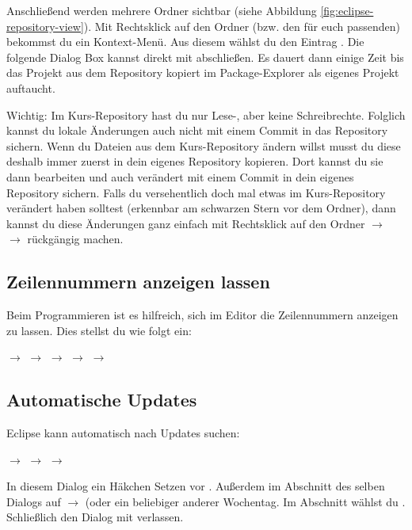 Anschließend werden mehrere Ordner sichtbar (siehe Abbildung
\ref{fig:eclipse-repository-view}). Mit Rechtsklick auf den Ordner 
(bzw. den für euch passenden) bekommst du ein Kontext-Menü. Aus diesem wählst du
den Eintrag . Die folgende Dialog Box kannst direkt mit
 abschließen. Es dauert dann einige Zeit bis das Projekt aus dem
Repository kopiert im Package-Explorer als eigenes Projekt auftaucht.

Wichtig: Im Kurs-Repository hast du nur Lese-, aber keine Schreibrechte.
Folglich kannst du lokale Änderungen auch nicht mit einem Commit in das
Repository sichern. Wenn du Dateien aus dem Kurs-Repository ändern willst musst
du diese deshalb immer zuerst in dein eigenes Repository kopieren. Dort kannst
du sie dann bearbeiten und auch verändert mit einem Commit in dein eigenes
Repository sichern. Falls du versehentlich doch mal etwas im Kurs-Repository
verändert haben solltest (erkennbar am schwarzen Stern vor dem Ordner), dann
kannst du diese Änderungen ganz einfach mit Rechtsklick auf den
Ordner $\rightarrow$  $\rightarrow$  rückgängig
machen.


\subsection{Zeilennummern anzeigen lassen}

Beim Programmieren ist es hilfreich, sich im Editor die Zeilennummern anzeigen
zu lassen. Dies stellst du wie folgt ein:

 $\rightarrow$  $\rightarrow$
 $\rightarrow$  $\rightarrow$  $\rightarrow$ 

\subsection{Automatische Updates} 

Eclipse kann automatisch nach Updates suchen:

 $\rightarrow$  $\rightarrow$
 $\rightarrow$  

In diesem Dialog ein Häkchen Setzen vor . Außerdem im Abschnitt  des selben
Dialogs auf  $\rightarrow$
 (oder ein beliebiger anderer Wochentag. Im Abschnitt
 wählst du . Schließlich den Dialog mit
 verlassen.

